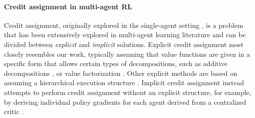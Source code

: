 \paragraph{Credit assignment in multi-agent RL}
Credit assignment, originally explored in the single-agent setting \cite{sutton1984temporal, riedmiller2018learning, ferret2019self, van2021expected}, is a problem that has been extensively explored in multi-agent learning literature and can be divided between \textit{explicit} and \textit{implicit} solutions. Explicit credit assignment most closely resembles our work, typically assuming that value functions are given in a specific form that allows certain types of decompositions, such as additive decompositions \cite{nguyen2017policy}, or 
value factorization \cite{wang2021towards, sunehag2017value}. Other explicit methods are based on assuming a hierarchical execution structure \cite{agogino2004unifying, feng2022multi, rashid2020monotonic}.
Implicit credit assignment instead attempts to perform credit assignment without an explicit structure, for example, by deriving individual policy gradients for each agent derived from a centralized critic \cite{zhou2020learning}. %